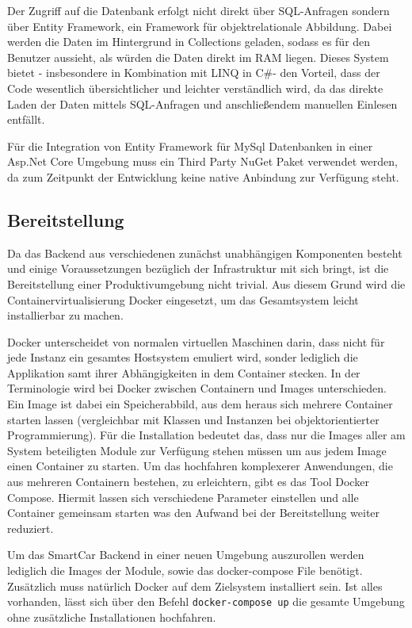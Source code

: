 Der Zugriff auf die Datenbank erfolgt nicht direkt über SQL-Anfragen sondern über Entity Framework, ein Framework für objektrelationale Abbildung. Dabei werden die Daten im Hintergrund in Collections geladen, sodass es für den Benutzer aussieht, als würden die Daten direkt im RAM liegen. Dieses System bietet - insbesondere in Kombination mit \ac{LINQ} in C\#- den Vorteil, dass der Code wesentlich übersichtlicher und leichter verständlich wird, da das direkte Laden der Daten mittels SQL-Anfragen und anschließendem manuellen Einlesen entfällt.

Für die Integration von Entity Framework für MySql Datenbanken in einer Asp.Net Core Umgebung muss ein Third Party NuGet Paket\cite{Microsoft2018} verwendet werden, da zum Zeitpunkt der Entwicklung keine native Anbindung zur Verfügung steht.

\subsection{Bereitstellung}
\label{sec:backendDeployment}
Da das Backend aus verschiedenen zunächst unabhängigen Komponenten besteht und einige Voraussetzungen bezüglich der Infrastruktur mit sich bringt, ist die Bereitstellung einer Produktivumgebung nicht trivial. 
Aus diesem Grund wird die Containervirtualisierung Docker eingesetzt, um das Gesamtsystem leicht installierbar zu machen.

Docker\cite{Inc.2018} unterscheidet von normalen virtuellen Maschinen darin, dass nicht für jede Instanz ein gesamtes Hostsystem emuliert wird, sonder lediglich die Applikation samt ihrer Abhängigkeiten in dem Container stecken. In der Terminologie wird bei Docker zwischen Containern und Images unterschieden. Ein Image ist dabei ein Speicherabbild, aus dem heraus sich mehrere Container starten lassen (vergleichbar mit Klassen und Instanzen bei objektorientierter Programmierung). Für die Installation bedeutet das, dass nur die Images aller am System beteiligten Module zur Verfügung stehen müssen um aus jedem Image einen Container zu starten. Um das hochfahren komplexerer Anwendungen, die aus mehreren Containern bestehen, zu erleichtern, gibt es das Tool Docker Compose. Hiermit lassen sich verschiedene Parameter einstellen und alle Container gemeinsam starten was den Aufwand bei der Bereitstellung weiter reduziert. 

Um das SmartCar Backend in einer neuen Umgebung auszurollen werden lediglich die Images der Module, sowie das docker-compose File benötigt. Zusätzlich muss natürlich Docker auf dem Zielsystem installiert sein. Ist alles vorhanden, lässt sich über den Befehl \texttt{docker-compose up} die gesamte Umgebung ohne zusätzliche Installationen hochfahren.

